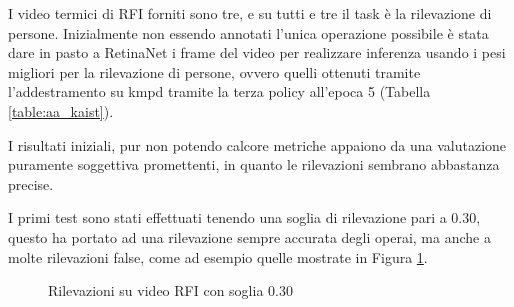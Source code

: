I video termici di \ac{RFI} forniti sono tre, e su tutti e tre il task è la rilevazione di persone. Inizialmente non essendo annotati l'unica operazione possibile è stata dare in pasto a RetinaNet i frame del video per realizzare inferenza usando i pesi migliori per la rilevazione di persone, ovvero quelli ottenuti tramite l'addestramento su \ac{kmpd} tramite la terza policy all'epoca 5 (Tabella \ref{table:aa_kaist}). 

I risultati iniziali, pur non potendo calcore metriche appaiono da una valutazione puramente soggettiva promettenti, in quanto le rilevazioni sembrano abbastanza precise. 

I primi test sono stati effettuati tenendo una soglia di rilevazione pari a $0.30$, questo ha portato ad una rilevazione sempre accurata degli operai, ma anche a molte rilevazioni false, come ad esempio quelle mostrate in Figura \ref{fig:rfi_030}. 

\begin{figure}[]
    \begin{minipage}{.5\linewidth}
        \centering
    \end{minipage}%
    \begin{minipage}{.5\linewidth}
        \centering
    \end{minipage}
    \centering
    \caption{Rilevazioni su video RFI con soglia 0.30}
    \label{fig:rfi_030}
\end{figure}

